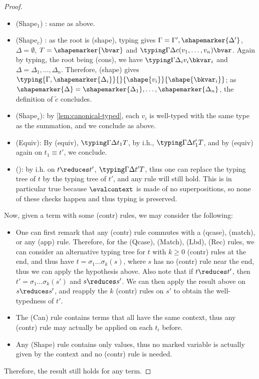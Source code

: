 \begin{proof}
\begin{itemize}
    \item (Shape$_1$) : same as above.

    \item (Shape$_c$) : as the root is (shape), typing gives $\Gamma
      = \Gamma', \shapemarker{\Delta'}$, $\Delta = \emptyset$, $T =
      \shapemarker{\bvar}$ and $\typing \Gamma \Delta {c(v_1, \dots,
      v_n)} \bvar$.
      Again by typing, the root being (cons), we have $\typing \Gamma
      {\Delta_i} {v_i} \bkvar_i$ and $\Delta = \Delta_1, \dots, \Delta_n$.
      Therefore, (shape) gives $\typing {\Gamma,
      \shapemarker{\Delta_i}} {} {\shape{v_i}} {\shape{\bkvar_i}}$;
      as $\shapemarker{\Delta} = \shapemarker{\Delta_1}, \dots,
      \shapemarker{\Delta_n}$, the definition of $\tilde c$ concludes.
    \item (Shape$_s$): by \autoref{lem:canonical-typed}, each $v_i$
      is well-typed with the same type as the summation, and we
      conclude as above.

    \item (Equiv): By (equiv), $\typing \Gamma \Delta {t_1} T$, by
      i.h., $\typing \Gamma \Delta {t_1'} T$, and by (equiv) again on
      $t_1 \equiv t'$, we conclude.

    \item (\evalcontext): by i.h. on $t \reduces t'$, $\typing \Gamma
      \Delta {t'} T$, thus one can replace the typing tree of $t$ by
      the typing tree of $t'$, and any rule will still hold.
      This is in particular true because $\evalcontext$ is made of no
      superpositions, so none of these checks happen and
      thus typing is preserved.
  \end{itemize}

  Now, given a term with some (contr) rules, we may consider the following:

  \begin{itemize}
    \item One can first remark that any (contr) rule commutes with a
      (qcase), (match), or any (app) rule.
      Therefore, for the (Qcase), (Match), (Lbd), (Rec)
      rules, we can consider an alternative typing tree for $t$ with
      $k \geq 0$ (contr) rules at the end,
      and thus have $t = \sigma_1 \dots \sigma_k(s)$, where $s$ has
      no (contr) rule near the end, thus we can apply the hypothesis above.
      Also note that if $t \reduces t'$, then $t' = \sigma_1 \dots
      \sigma_k(s')$ and $s \reduces s'$. We can then apply the result
      above on $s \reduces s'$,
      and reapply the $k$ (contr) rules on $s'$ to obtain the
      well-typedness of $t'$.
    \item The (Can) rule contains terms that all have the same
      context, thus any (contr) rule may actually be applied on each
      $t_i$ before.
    \item Any (Shape) rule contains only values, thus no marked
      variable is actually given by the context and no (contr) rule is needed.
  \end{itemize}

  Therefore, the result still holds for any term. \qedhere
\end{proof}

